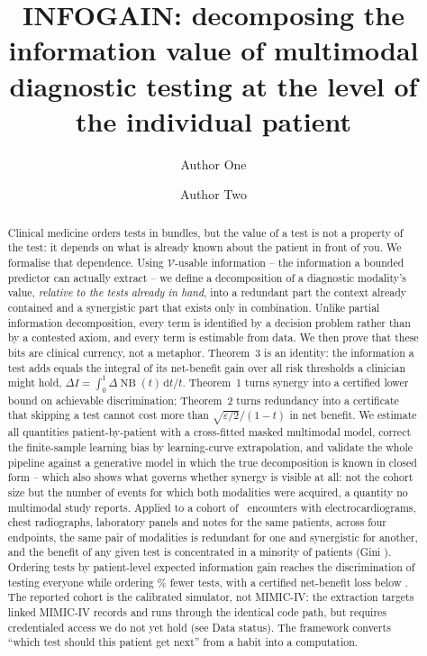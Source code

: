 \documentclass[11pt]{article}
\title{\bfseries INFOGAIN: decomposing the information value of multimodal
diagnostic testing at the level of the individual patient}
\author[1]{Author One}
\author[1]{Author Two}
\affil[1]{Affiliation}
\date{}
\theoremstyle{definition}
\theoremstyle{remark}
\DeclareMathOperator{\NB}{NB}
\newcommand{\Vc}{\mathcal{V}}
\begin{document}
\maketitle

\begin{abstract}
\noindent
Clinical medicine orders tests in bundles, but the value of a test is not a
property of the test: it depends on what is already known about the patient in
front of you. We formalise that dependence. Using $\Vc$-usable information --
the information a bounded predictor can actually extract -- we define a
decomposition of a diagnostic modality's value, \emph{relative to the tests
already in hand}, into a redundant part the context already contained and a
synergistic part that exists only in combination. Unlike partial information
decomposition, every term is identified by a decision problem rather than by a
contested axiom, and every term is estimable from data. We then prove that these
bits are clinical currency, not a metaphor. Theorem~3 is an identity: the
information a test adds equals the integral of its net-benefit gain over all
risk thresholds a clinician might hold, $\Delta I = \int_0^1 \Delta \NB(t)\,
\mathrm{d}t/t$. Theorem~1 turns synergy into a certified lower bound on
achievable discrimination; Theorem~2 turns redundancy into a certificate that
skipping a test cannot cost more than $\sqrt{\varepsilon/2}/(1-t)$ in net
benefit. We estimate all quantities patient-by-patient with a cross-fitted
masked multimodal model, correct the finite-sample learning bias by
learning-curve extrapolation, and validate the whole pipeline against a
generative model in which the true decomposition is known in closed form -- which
also shows what governs whether synergy is visible at all: not the cohort size
but the number of events for which both modalities were acquired, a quantity no
multimodal study reports. Applied to a cohort of \cohortN\ encounters with
electrocardiograms, chest radiographs, laboratory panels and notes for the same
patients, across four endpoints, the same pair of modalities is redundant for
one and synergistic for another, and the benefit of any given test is
concentrated in a minority of patients (Gini \gainMaxGini). Ordering tests by
patient-level expected information gain reaches the discrimination of testing
everyone while ordering \redTestsAvoided\% fewer tests, with a certified
net-benefit loss below \redCertifiedLoss. The reported cohort is the calibrated
simulator, not MIMIC-IV: the extraction targets linked MIMIC-IV records and runs
through the identical code path, but requires credentialed access we do not yet
hold (see Data status). The framework converts ``which test should this patient
get next'' from a habit into a computation.
\end{abstract}
\end{document}
